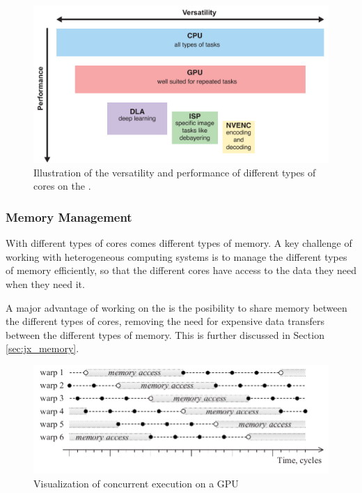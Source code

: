 \begin{figure}
    \centering
    \includegraphics[width=\textwidth]{figures/PDF/jx_hierarchy.pdf}
    \caption{Illustration of the versatility and performance of different types of cores on the \jx.}
    \label{fig:jx_hierarchy}
\end{figure}


\subsubsection{Memory Management}
With different types of cores comes different types of memory.
A key challenge of working with heterogeneous computing systems is to manage the different types of memory efficiently, so that the different cores have access to the data they need when they need it.

A major advantage of working on the \jx is the posibility to share memory between the different types of cores, removing the need for expensive data transfers between the different types of memory.
This is further discussed in Section \ref{sec:jx_memory}.

\begin{figure}
    \centering
    \includegraphics[width=\textwidth]{figures/PDF/concurrency_p54.pdf}
    \caption{Visualization of concurrent execution on a GPU \cite[54]{volkovLatencyHiding2016}}
    \label{fig:concurrency}
\end{figure}


